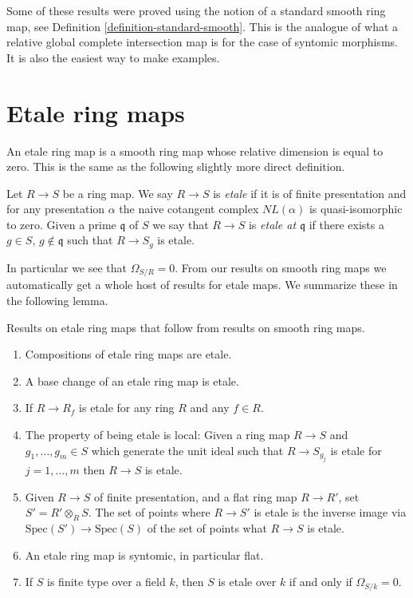 Some of these results were proved using the notion of a standard
smooth ring map, see Definition \ref{definition-standard-smooth}.
This is the analogue of what a relative global 
complete intersection map is for the case of syntomic morphisms.
It is also the easiest way to make examples.













\section{Etale ring maps}
\label{section-etale}

\noindent
An etale ring map is a smooth ring map whose relative dimension
is equal to zero. This is the same as the following slightly more
direct definition.

\begin{definition}
\label{definition-etale}
Let $R \to S$ be a ring map.
We say $R \to S$ is {\it etale} if it is of finite presentation
and for any presentation $\alpha$ the naive cotangent complex
$NL(\alpha)$ is quasi-isomorphic to zero. Given a prime $\mathfrak q$
of $S$ we say that $R \to S$ is {\it etale at $\mathfrak q$}
if there exists a $g \in S$, $g \not \in \mathfrak q$ such that
$R \to S_g$ is etale.
\end{definition}

\noindent
In particular we see that $\Omega_{S/R} = 0$.
From our results on smooth ring maps we automatically get a whole host
of results for etale maps. We summarize these in the following
lemma.

\begin{lemma}
\label{lemma-etale}
Results on etale ring maps that follow from results on smooth ring maps.
\begin{enumerate}
\item Compositions of etale ring maps are etale.
\item A base change of an etale ring map is etale.
\item If $R \to R_f$ is etale for any ring $R$ and any $f \in R$.
\item The property of being etale is local: Given a ring map
$R \to S$ and $g_1, \ldots, g_m \in S$ which generate the unit ideal
such that $R \to S_{g_j}$ is etale for $j = 1, \ldots, m$ then
$R \to S$ is etale.
\item Given $R \to S$ of finite presentation, and a flat ring map
$R \to R'$, set $S' = R' \otimes_R S$. The set of points where $R \to S'$
is etale is the inverse image via $\text{Spec}(S') \to \text{Spec}(S)$
of the set of points what $R \to S$ is etale.
\item An etale ring map is syntomic, in particular flat.
\item If $S$ is finite type over a field $k$, then $S$ is etale over
$k$ if and only if $\Omega_{S/k} = 0$.
\end{enumerate}
\end{lemma}

